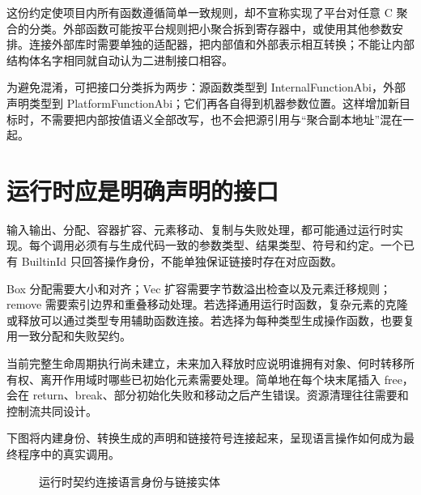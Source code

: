 这份约定使项目内所有函数遵循简单一致规则，却不宣称实现了平台对任意 C 聚合的分类。外部函数可能按平台规则把小聚合拆到寄存器中，或使用其他参数安排。连接外部库时需要单独的适配器，把内部值和外部表示相互转换；不能让内部结构体名字相同就自动认为二进制接口相容。

为避免混淆，可把接口分类拆为两步：源函数类型到 InternalFunctionAbi，外部声明类型到 PlatformFunctionAbi；它们再各自得到机器参数位置。这样增加新目标时，不需要把内部按值语义全部改写，也不会把源引用与“聚合副本地址”混在一起。

\section{运行时应是明确声明的接口}
输入输出、分配、容器扩容、元素移动、复制与失败处理，都可能通过运行时实现。每个调用必须有与生成代码一致的参数类型、结果类型、符号和约定。一个已有 BuiltinId 只回答操作身份，不能单独保证链接时存在对应函数。

Box 分配需要大小和对齐；Vec 扩容需要字节数溢出检查以及元素迁移规则；remove 需要索引边界和重叠移动处理。若选择通用运行时函数，复杂元素的克隆或释放可以通过类型专用辅助函数连接。若选择为每种类型生成操作函数，也要复用一致分配和失败契约。

当前完整生命周期执行尚未建立，未来加入释放时应说明谁拥有对象、何时转移所有权、离开作用域时哪些已初始化元素需要处理。简单地在每个块末尾插入 free，会在 return、break、部分初始化失败和移动之后产生错误。资源清理往往需要和控制流共同设计。

下图将内建身份、转换生成的声明和链接符号连接起来，呈现语言操作如何成为最终程序中的真实调用。
\begin{figure}[htbp]\centering
{}
\caption{运行时契约连接语言身份与链接实体}
\end{figure}

